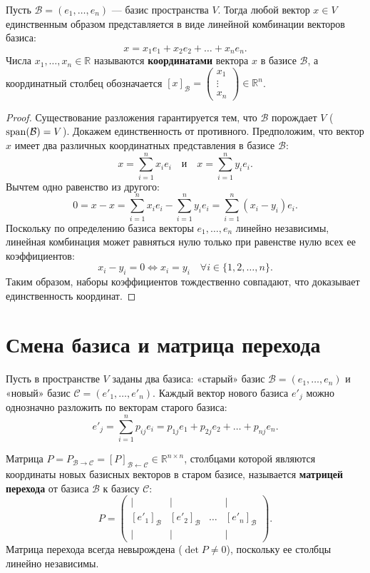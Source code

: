 \begin{theorem}
Пусть $\mathcal{B} = (e_1, \dots, e_n)$ — базис пространства $V$.
Тогда любой вектор $x \in V$ единственным образом представляется в виде линейной комбинации векторов базиса:
\[ x = x_1 e_1 + x_2 e_2 + \dots + x_n e_n. \]
Числа $x_1, \dots, x_n \in \mathbb{R}$ называются \textbf{координатами} вектора $x$ в базисе $\mathcal{B}$, а
координатный столбец обозначается
$[x]_\mathcal{B} = \begin{pmatrix}
                       x_1 \\ \vdots \\ x_n
\end{pmatrix} \in \mathbb{R}^n$.
\end{theorem}
\begin{proof}
    Существование разложения гарантируется тем, что $\mathcal{B}$ порождает $V$ ($\operatorname{span}(\mathcal{B}) = V$).
    Докажем единственность от противного.
    Предположим, что вектор $x$ имеет два различных координатных представления в базисе $\mathcal{B}$:
    \[ x = \sum_{i=1}^n x_i e_i \quad \text{и} \quad x = \sum_{i=1}^n y_i e_i. \]
    Вычтем одно равенство из другого:
    \[ 0 = x - x = \sum_{i=1}^n x_i e_i - \sum_{i=1}^n y_i e_i = \sum_{i=1}^n (x_i - y_i) e_i. \]
    Поскольку по определению базиса векторы $e_1, \dots, e_n$ линейно независимы, линейная комбинация может
    равняться нулю только при равенстве нулю всех ее коэффициентов:
    \[ x_i - y_i = 0 \iff x_i = y_i \quad \forall i \in \{1, 2, \dots, n\}. \]
    Таким образом, наборы коэффициентов тождественно совпадают, что доказывает единственность координат.
\end{proof}

\section{Смена базиса и матрица перехода}

Пусть в пространстве $V$ заданы два базиса: «старый» базис $\mathcal{B} = (e_1, \dots, e_n)$ и «новый» базис
$\mathcal{C} = (e'_1, \dots, e'_n)$.
Каждый вектор нового базиса $e'_j$ можно однозначно разложить по векторам старого базиса:
\[ e'_j = \sum_{i=1}^n p_{ij} e_i = p_{1j} e_1 + p_{2j} e_2 + \dots + p_{nj} e_n. \]
\begin{definition}
Матрица $P = P_{\mathcal{B} \to \mathcal{C}} = [P]_{\mathcal{B} \leftarrow \mathcal{C}} \in \mathbb{R}^{n \times n}$,
столбцами которой являются координаты новых базисных векторов в старом базисе, называется \textbf{матрицей перехода} от
базиса $\mathcal{B}$ к базису $\mathcal{C}$:
\[ P = \begin{pmatrix}
           | & | & & | \\
           [e'_1]_\mathcal{B} & [e'_2]_\mathcal{B} & \dots & [e'_n]_\mathcal{B} \\
           | & | & & |
\end{pmatrix}. \]
Матрица перехода всегда невырождена ($\det P \ne 0$), поскольку ее столбцы линейно независимы.
\end{definition}

